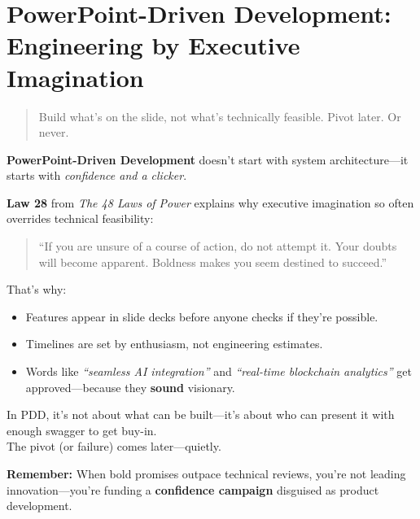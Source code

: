 \section{PowerPoint-Driven Development: Engineering by Executive Imagination}

\begin{quote}
Build what's on the slide, not what’s technically feasible. Pivot later. Or never.
\end{quote}

  \textbf{PowerPoint-Driven Development} doesn’t start with system architecture—it starts with \textit{confidence and a clicker}.
  
  \medskip
  
  \textbf{Law 28} from \textit{The 48 Laws of Power} explains why executive imagination so often overrides technical feasibility:
  \begin{quote}
  ``If you are unsure of a course of action, do not attempt it. Your doubts will become apparent. Boldness makes you seem destined to succeed.''
  \end{quote}
  
  \medskip
  
  That’s why:
  \begin{itemize}
    \item Features appear in slide decks before anyone checks if they’re possible.
    \item Timelines are set by enthusiasm, not engineering estimates.
    \item Words like \textit{``seamless AI integration''} and \textit{``real-time blockchain analytics''} get approved—because they \textbf{sound} visionary.
  \end{itemize}
  
  \medskip
  
  In PDD, it’s not about what can be built—it’s about who can present it with enough swagger to get buy-in. \\
  The pivot (or failure) comes later—quietly.
  
  \medskip
  
  \textbf{Remember:} When bold promises outpace technical reviews, you’re not leading innovation—you’re funding a \textbf{confidence campaign} disguised as product development.
  
  



